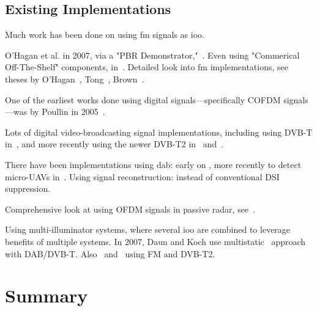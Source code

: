 \documentclass[class=report,11pt,crop=false]{standalone}
\begin{document}
\subsection{Existing Implementations}
Much work has been done on using \gls{fm} signals as \gls{ioo}.

O'Hagan et al. in 2007, via a "PBR Demonstrator,"~\cite{OHagan2007}. Even using "Commerical Off-The-Shelf" components, in~\cite{Tong2015}. Detailed look into \gls{fm} implementations, see theses by O'Hagan~\cite{o2009passive}, Tong~\cite{tong2014}, Brown~\cite{brown2013fm}.

One of the earliest works done using digital signals---specifically COFDM signals---was by Poullin in 2005~\cite{Poullin2005}.

Lots of digital video-broadcasting signal implementations, including using DVB-T in~\cite{radmard2012feasibility, palmer2011overview,Peto2014}, and more recently using the newer DVB-T2 in~\cite{OHagan2018} and~\cite{Low2019}.

There have been implementations using \gls{dab}: early on \cite{Yardley2007,Coleman2008}, more recently to detect micro-UAVs in~\cite{Schupbach2017}.
Using signal reconstruction: \cite{ohagan2010dab} instead of conventional DSI suppression.

Comprehensive look at using OFDM signals in passive radar, see~\cite{Berger2010}.

Using multi-illuminator systems, where several \gls{ioo} are combined to leverage benefits of multiple systems. In 2007, Daun and Koch use multistatic~\cite{Daun2007} approach with DAB/DVB-T. Also~\cite{Edrich2014} and~\cite{Paine2018} using FM and DVB-T2.

\section{Summary}

\ifstandalone

\printnoidxglossary[type=\acronymtype,nonumberlist]
\fi
\end{document}
